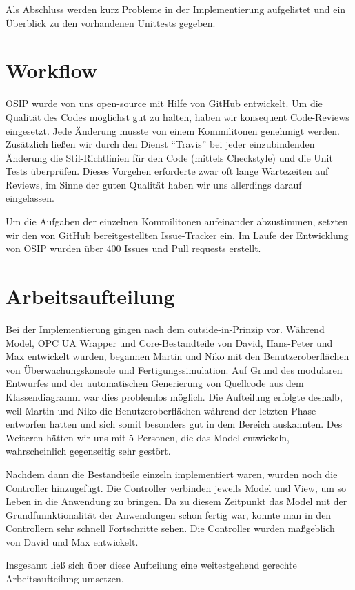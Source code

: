 \documentclass[parskip=full]{scrartcl}
\begin{document}
Als Abschluss werden kurz Probleme in der Implementierung aufgelistet und ein Überblick zu den vorhandenen Unittests gegeben.

\section{Workflow}
OSIP wurde von uns open-source mit Hilfe von GitHub entwickelt. Um die Qualität des Codes möglichst gut zu halten,
haben wir konsequent Code-Reviews eingesetzt. Jede Änderung musste von einem Kommilitonen genehmigt werden. Zusätzlich ließen wir
durch den Dienst "`Travis"' bei jeder einzubindenden Änderung die Stil-Richtlinien für den Code (mittels Checkstyle) und die Unit Tests überprüfen.
Dieses Vorgehen erforderte zwar oft lange Wartezeiten auf Reviews, im Sinne der guten Qualität haben wir uns allerdings darauf eingelassen. 

Um die Aufgaben der einzelnen Kommilitonen aufeinander abzustimmen, setzten wir den von GitHub bereitgestellten Issue-Tracker ein. Im Laufe der
Entwicklung von OSIP wurden über 400 Issues und Pull requests erstellt.

\section{Arbeitsaufteilung}
Bei der Implementierung gingen nach dem outside-in-Prinzip vor. Während Model, OPC UA Wrapper und Core-Bestandteile von David, Hans-Peter und Max entwickelt wurden,
begannen Martin und Niko mit den Benutzeroberflächen von Überwachungskonsole und Fertigungssimulation. Auf Grund des modularen Entwurfes
und der automatischen Generierung von Quellcode aus dem Klassendiagramm war dies problemlos möglich. Die Aufteilung erfolgte deshalb, weil Martin und Niko die
Benutzeroberflächen während der letzten Phase entworfen hatten und sich somit besonders gut in dem Bereich auskannten. Des Weiteren hätten wir uns mit 5 Personen,
die das Model entwickeln, wahrscheinlich gegenseitig sehr gestört.

Nachdem dann die Bestandteile einzeln implementiert waren, wurden noch die Controller hinzugefügt. Die Controller verbinden jeweils Model und View,
um so Leben in die Anwendung zu bringen. Da zu diesem Zeitpunkt das Model mit der Grundfunnktionalität der Anwendungen schon fertig war,
konnte man in den Controllern sehr schnell Fortschritte sehen. Die Controller wurden maßgeblich von David und Max entwickelt.

Insgesamt ließ sich über diese Aufteilung eine weitestgehend gerechte Arbeitsaufteilung umsetzen.
\end{document}
